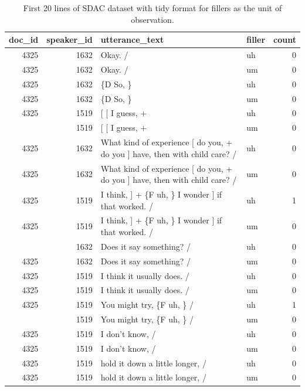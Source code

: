 \documentclass[
  letterpaper,
]{latex/krantz}
\begin{document}
\hypertarget{tbl-td-sdac-count-disfluencies-longer-show}{}
\begin{table}
\caption{\label{tbl-td-sdac-count-disfluencies-longer-show}First 20 lines of SDAC dataset with tidy format for fillers as the unit
of observation. }\tabularnewline

\centering
\begin{tabular}{rrllr}
\toprule
doc\_id & speaker\_id & utterance\_text & filler & count\\
\midrule
4325 & 1632 & Okay.  / & uh & 0\\
4325 & 1632 & Okay.  / & um & 0\\
4325 & 1632 & \{D So, \} & uh & 0\\
4325 & 1632 & \{D So, \} & um & 0\\
4325 & 1519 & {}[ [ I guess, + & uh & 0\\
\addlinespace
4325 & 1519 & {}[ [ I guess, + & um & 0\\
4325 & 1632 & What kind of experience [ do you, + do you ] have, then with child care? / & uh & 0\\
4325 & 1632 & What kind of experience [ do you, + do you ] have, then with child care? / & um & 0\\
4325 & 1519 & I think, ] + \{F uh, \} I wonder ] if that worked. / & uh & 1\\
4325 & 1519 & I think, ] + \{F uh, \} I wonder ] if that worked. / & um & 0\\
\addlinespace
4325 & 1632 & Does it say something? / & uh & 0\\
4325 & 1632 & Does it say something? / & um & 0\\
4325 & 1519 & I think it usually does.  / & uh & 0\\
4325 & 1519 & I think it usually does.  / & um & 0\\
4325 & 1519 & You might try, \{F uh, \}  / & uh & 1\\
\addlinespace
4325 & 1519 & You might try, \{F uh, \}  / & um & 0\\
4325 & 1519 & I don't know,  / & uh & 0\\
4325 & 1519 & I don't know,  / & um & 0\\
4325 & 1519 & hold it down a little longer,  / & uh & 0\\
4325 & 1519 & hold it down a little longer,  / & um & 0\\
\bottomrule
\end{tabular}
\end{table}
\end{document}
